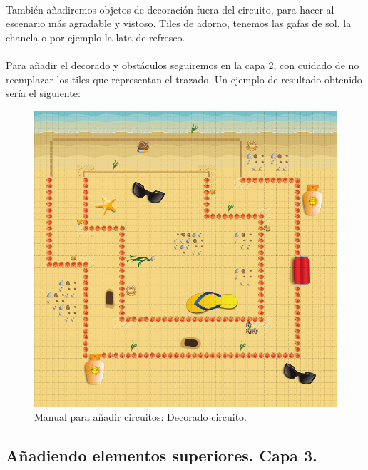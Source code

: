 \paragraph{}
También añadiremos objetos de decoración fuera del circuito, para hacer al escenario más agradable y vistoso. Tiles de adorno,
tenemos las gafas de sol, la chancla o por ejemplo la lata de refresco.

\paragraph{}
Para añadir el decorado y obstáculos seguiremos en la capa 2, con cuidado de no reemplazar los tiles que representan el trazado.
Un ejemplo de resultado obtenido sería el siguiente:

\begin{figure}[H]
  \label{circuito_decorado}
  \begin{center}
    \includegraphics[scale=0.5]{imagenes/manualcircuito/circuito_decorado.png}
  \end{center}
  \caption{Manual para añadir circuitos: Decorado circuito.}
\end{figure}

\subsection{Añadiendo elementos superiores. Capa 3.}

